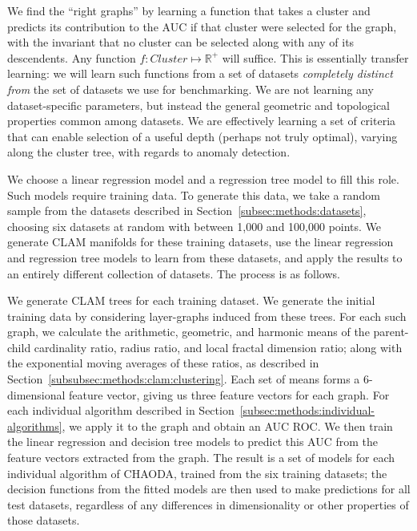 We find the ``right graphs'' by learning a function that takes a cluster and predicts its contribution to the AUC if that cluster were selected for the graph, with the invariant that no cluster can be selected along with any of its descendents.
Any function $f: Cluster \mapsto \mathbb{R}^+$ will suffice.
This is essentially transfer learning: we will learn such functions from a set of datasets \emph{completely distinct from} the set of datasets we use for benchmarking.
We are not learning any dataset-specific parameters, but instead the general geometric and topological properties common among datasets.
We are effectively learning a set of criteria that can enable selection of a useful depth (perhaps not truly optimal), varying along the cluster tree, with regards to anomaly detection.

We choose a linear regression model and a regression tree model to fill this role.
Such models require training data.
To generate this data, we take a random sample from the datasets described in Section~\ref{subsec:methods:datasets}, choosing six datasets at random with between 1,000 and 100,000 points.
We generate CLAM manifolds for these training datasets, use the linear regression and regression tree models to learn from these datasets, and apply the results to an entirely different collection of datasets.
The process is as follows.

We generate CLAM trees for each training dataset.
We generate the initial training data by considering layer-graphs induced from these trees.
For each such graph, we calculate the arithmetic, geometric, and harmonic means of the parent-child cardinality ratio, radius ratio, and local fractal dimension ratio;
along with the exponential moving averages of these ratios, as described in Section~\ref{subsubsec:methods:clam:clustering}.
Each set of means forms a 6-dimensional feature vector, giving us three feature vectors for each graph.
For each individual algorithm described in Section~\ref{subsec:methods:individual-algorithms}, we apply it to the graph and obtain an AUC ROC\@.
We then train the linear regression and decision tree models to predict this AUC from the feature vectors extracted from the graph.
The result is a set of models for each individual algorithm of CHAODA, trained from the six training datasets;
the decision functions from the fitted models are then used to make predictions for all test datasets, regardless of any differences in dimensionality or other properties of those datasets.

